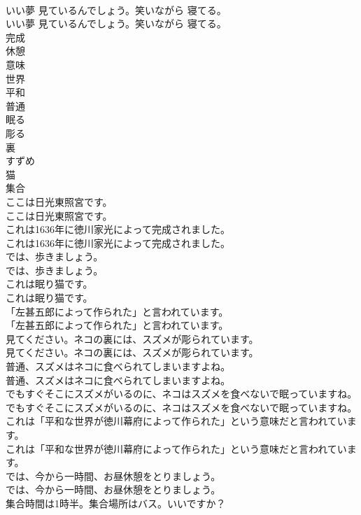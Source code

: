 \documentclass[8pt]{extreport}
\begin{document}
\begin{CJK}{UTF8}{min}
\\	いい夢 見ているんでしょう。笑いながら 寝てる。	
\\	いい夢 見ているんでしょう。笑いながら 寝てる。 
\\	完成
\\	休憩
\\	意味
\\	世界
\\	平和
\\	普通
\\	眠る
\\	彫る
\\	裏
\\	すずめ
\\	猫
\\	集合
\\	ここは日光東照宮です。	
\\	ここは日光東照宮です。 
\\	これは1636年に徳川家光によって完成されました。	
\\	これは1636年に徳川家光によって完成されました。 
\\	では、歩きましょう。	
\\	では、歩きましょう。 
\\	これは眠り猫です。	
\\	これは眠り猫です。 
\\	「左甚五郎によって作られた」と言われています。	
\\	「左甚五郎によって作られた」と言われています。 
\\	見てください。ネコの裏には、スズメが彫られています。	
\\	見てください。ネコの裏には、スズメが彫られています。 
\\	普通、スズメはネコに食べられてしまいますよね。	
\\	普通、スズメはネコに食べられてしまいますよね。 
\\	でもすぐそこにスズメがいるのに、ネコはスズメを食べないで眠っていますね。	
\\	でもすぐそこにスズメがいるのに、ネコはスズメを食べないで眠っていますね。 
\\	これは「平和な世界が徳川幕府によって作られた」という意味だと言われています。	
\\	これは「平和な世界が徳川幕府によって作られた」という意味だと言われています。 
\\	では、今から一時間、お昼休憩をとりましょう。	
\\	では、今から一時間、お昼休憩をとりましょう。 
\\	集合時間は1時半。集合場所はバス。いいですか？	

\end{CJK}
\end{document}
